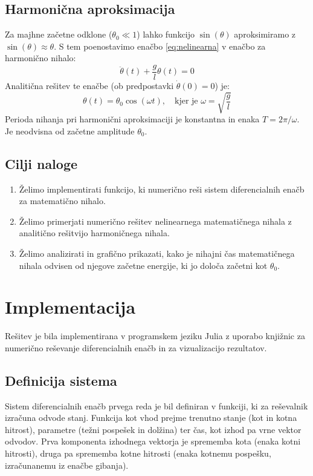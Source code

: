 \documentclass{article}
\begin{document}
\subsection{Harmonična aproksimacija}
Za majhne začetne odklone ($\theta_0 \ll 1$) lahko funkcijo $\sin(\theta)$ aproksimiramo z 
$\sin(\theta) \approx \theta$. S tem poenostavimo enačbo \ref{eq:nelinearna} v enačbo za harmonično nihalo:
\begin{equation}
\ddot{\theta}(t) + \frac{g}{l} \theta(t) = 0
\label{eq:linearna}
\end{equation}
Analitična rešitev te enačbe (ob predpostavki $\dot{\theta}(0) = 0$) je:
\begin{equation}
\theta(t) = \theta_0 \cos(\omega t), \quad \text{kjer je } \omega = \sqrt{\frac{g}{l}}
\end{equation}
Perioda nihanja pri harmonični aproksimaciji je konstantna in enaka $T = 2\pi/\omega$. Je neodvisna 
od začetne amplitude $\theta_0$.

\subsection{Cilji naloge}
\begin{enumerate}
    \item Želimo implementirati funkcijo, ki numerično reši sistem diferencialnih enačb za 
    matematično nihalo.
    \item Želimo primerjati numerično rešitev nelinearnega matematičnega nihala 
    z analitično rešitvijo harmoničnega nihala.
    \item Želimo analizirati in grafično prikazati, kako je nihajni čas 
    matematičnega nihala odvisen od njegove začetne energije, ki jo določa začetni kot $\theta_0$.
\end{enumerate}


\section{Implementacija}

Rešitev je bila implementirana v programskem jeziku Julia z uporabo knjižnic za
numerično reševanje diferencialnih enačb in za vizualizacijo rezultatov.

\subsection{Definicija sistema}
Sistem diferencialnih enačb prvega reda je bil definiran v funkciji, ki za reševalnik
izračuna odvode stanj. Funkcija kot vhod prejme trenutno stanje (kot in kotna hitrost),
parametre (težni pospešek in dolžina) ter čas, kot izhod pa vrne vektor odvodov. Prva
komponenta izhodnega vektorja je sprememba kota (enaka kotni hitrosti), druga pa sprememba
kotne hitrosti (enaka kotnemu pospešku, izračunanemu iz enačbe gibanja).
\end{document}
